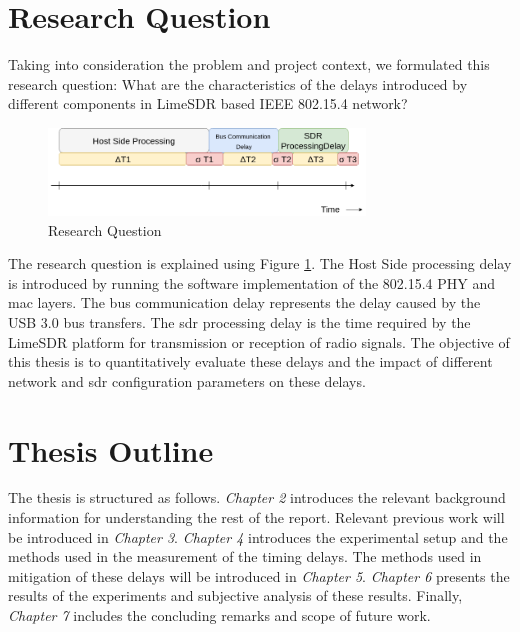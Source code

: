 







\section{Research Question}
Taking into consideration the problem and project context, we formulated this research question:
What are the characteristics of the delays introduced by different components in LimeSDR based IEEE 802.15.4 network?
\begin{figure}[!h]
\centering
\includegraphics[width=0.75\textwidth]{Figure/RQ1.png}
\caption{Research Question}
\label{rq1}
\end{figure}

The research question is explained using Figure \ref{rq1}.
The Host Side processing delay is introduced by running the software implementation of the 802.15.4 \ac{PHY} and \ac{mac} layers.
The bus communication delay represents the delay caused by the \ac{USB} 3.0 bus transfers.
The \ac{sdr} processing delay is the time required by the LimeSDR platform for transmission or reception of radio signals.
The objective of this thesis is to quantitatively evaluate these delays and the impact of different network and \ac{sdr} configuration parameters on these delays.

\section{Thesis Outline}
The thesis is structured as follows. \textit{Chapter 2} introduces the relevant background information for understanding the rest of the report.
Relevant previous work will be introduced in \textit{Chapter 3}.
\textit{Chapter 4} introduces the experimental setup and the methods used in the measurement of the timing delays.
The methods used in mitigation of these delays will be introduced in \textit{Chapter 5}.
\textit{Chapter 6} presents the results of the experiments and subjective analysis of these results.
Finally, \textit{Chapter 7} includes the concluding remarks and scope of future work.
